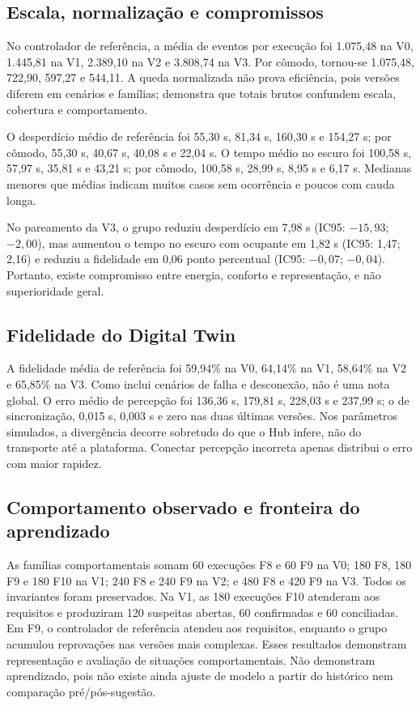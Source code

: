 \documentclass[10pt,a4paper]{article}
\begin{document}
\subsection{Escala, normalização e compromissos}

No controlador de referência, a média de eventos por execução foi 1.075,48 na V0, 1.445,81 na V1, 2.389,10 na V2 e 3.808,74 na V3. Por cômodo, tornou-se 1.075,48, 722,90, 597,27 e 544,11. A queda normalizada não prova eficiência, pois versões diferem em cenários e famílias; demonstra que totais brutos confundem escala, cobertura e comportamento.

O desperdício médio de referência foi 55,30 s, 81,34 s, 160,30 s e 154,27 s; por cômodo, 55,30 s, 40,67 s, 40,08 s e 22,04 s. O tempo médio no escuro foi 100,58 s, 57,97 s, 35,81 s e 43,21 s; por cômodo, 100,58 s, 28,99 s, 8,95 s e 6,17 s. Medianas menores que médias indicam muitos casos sem ocorrência e poucos com cauda longa.

No pareamento da V3, o grupo reduziu desperdício em 7,98 s (IC95: $-15{,}93$; $-2{,}00$), mas aumentou o tempo no escuro com ocupante em 1,82 s (IC95: 1,47; 2,16) e reduziu a fidelidade em 0,06 ponto percentual (IC95: $-0{,}07$; $-0{,}04$). Portanto, existe compromisso entre energia, conforto e representação, e não superioridade geral.

\subsection{Fidelidade do Digital Twin}

A fidelidade média de referência foi 59,94\% na V0, 64,14\% na V1, 58,64\% na V2 e 65,85\% na V3. Como inclui cenários de falha e desconexão, não é uma nota global. O erro médio de percepção foi 136,36 s, 179,81 s, 228,03 s e 237,99 s; o de sincronização, 0,015 s, 0,003 s e zero nas duas últimas versões. Nos parâmetros simulados, a divergência decorre sobretudo do que o Hub infere, não do transporte até a plataforma. Conectar percepção incorreta apenas distribui o erro com maior rapidez.

\subsection{Comportamento observado e fronteira do aprendizado}

As famílias comportamentais somam 60 execuções F8 e 60 F9 na V0; 180 F8, 180 F9 e 180 F10 na V1; 240 F8 e 240 F9 na V2; e 480 F8 e 420 F9 na V3. Todos os invariantes foram preservados. Na V1, as 180 execuções F10 atenderam aos requisitos e produziram 120 suspeitas abertas, 60 confirmadas e 60 conciliadas. Em F9, o controlador de referência atendeu aos requisitos, enquanto o grupo acumulou reprovações nas versões mais complexas. Esses resultados demonstram representação e avaliação de situações comportamentais. Não demonstram aprendizado, pois não existe ainda ajuste de modelo a partir do histórico nem comparação pré/pós-sugestão.
\end{document}
